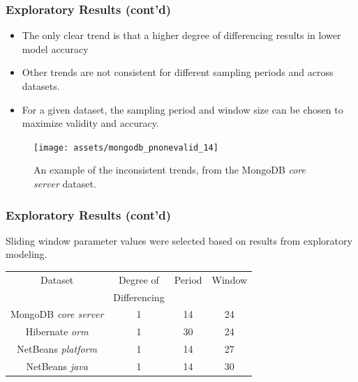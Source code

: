 \documentclass[presentation]{beamer}
\begin{document}
\begin{frame}[t]
\frametitle{Exploratory Results (cont'd)}
\begin{itemize}
\item
The only clear trend is that a higher degree of differencing results in lower model accuracy
\item
Other trends are not consistent for different sampling periods and across datasets.
\item
For a given dataset, the sampling period and window size can be chosen to maximize validity and accuracy.
\end{itemize}

\begin{figure}[htbp]
\begin{center}
\texttt{[image: assets/mongodb\_pnonevalid\_14]}
\caption{An example of the inconsistent trends, from the MongoDB \textit{core server} dataset.}
\end{center}
\end{figure}

\end{frame}

\begin{frame}[t]
\frametitle{Exploratory Results (cont'd)}
Sliding window parameter values were selected based on results from exploratory modeling.

\begin{table}
\centering
\scriptsize  
\begin{tabular}{c | c | c | c}
Dataset & Degree of & Period & Window \\
~ & Differencing & ~ & ~ \\
\hline
MongoDB \textit{core server} & 1 & 14 & 24 \\
Hibernate \textit{orm} & 1 & 30 & 24 \\
NetBeans \textit{platform} & 1 & 14 & 27 \\
NetBeans \textit{java} & 1 & 14 & 30 \\
\hline
\end{tabular}
\end{table}

\end{frame}
\end{document}
